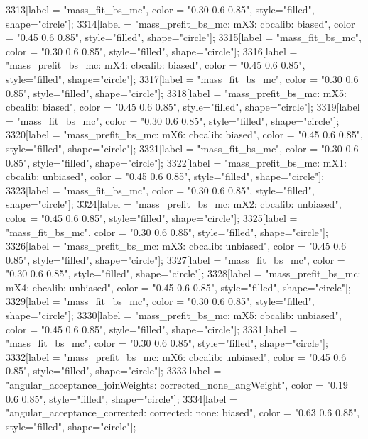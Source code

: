 {	3313[label = "mass_fit_bs_mc", color = "0.30 0.6 0.85", style="filled", shape="circle"];
	3314[label = "mass_prefit_bs_mc\nmassbin: mX3\nmassmodel: cbcalib\ntrigger: biased", color = "0.45 0.6 0.85", style="filled", shape="circle"];
	3315[label = "mass_fit_bs_mc", color = "0.30 0.6 0.85", style="filled", shape="circle"];
	3316[label = "mass_prefit_bs_mc\nmassbin: mX4\nmassmodel: cbcalib\ntrigger: biased", color = "0.45 0.6 0.85", style="filled", shape="circle"];
	3317[label = "mass_fit_bs_mc", color = "0.30 0.6 0.85", style="filled", shape="circle"];
	3318[label = "mass_prefit_bs_mc\nmassbin: mX5\nmassmodel: cbcalib\ntrigger: biased", color = "0.45 0.6 0.85", style="filled", shape="circle"];
	3319[label = "mass_fit_bs_mc", color = "0.30 0.6 0.85", style="filled", shape="circle"];
	3320[label = "mass_prefit_bs_mc\nmassbin: mX6\nmassmodel: cbcalib\ntrigger: biased", color = "0.45 0.6 0.85", style="filled", shape="circle"];
	3321[label = "mass_fit_bs_mc", color = "0.30 0.6 0.85", style="filled", shape="circle"];
	3322[label = "mass_prefit_bs_mc\nmassbin: mX1\nmassmodel: cbcalib\ntrigger: unbiased", color = "0.45 0.6 0.85", style="filled", shape="circle"];
	3323[label = "mass_fit_bs_mc", color = "0.30 0.6 0.85", style="filled", shape="circle"];
	3324[label = "mass_prefit_bs_mc\nmassbin: mX2\nmassmodel: cbcalib\ntrigger: unbiased", color = "0.45 0.6 0.85", style="filled", shape="circle"];
	3325[label = "mass_fit_bs_mc", color = "0.30 0.6 0.85", style="filled", shape="circle"];
	3326[label = "mass_prefit_bs_mc\nmassbin: mX3\nmassmodel: cbcalib\ntrigger: unbiased", color = "0.45 0.6 0.85", style="filled", shape="circle"];
	3327[label = "mass_fit_bs_mc", color = "0.30 0.6 0.85", style="filled", shape="circle"];
	3328[label = "mass_prefit_bs_mc\nmassbin: mX4\nmassmodel: cbcalib\ntrigger: unbiased", color = "0.45 0.6 0.85", style="filled", shape="circle"];
	3329[label = "mass_fit_bs_mc", color = "0.30 0.6 0.85", style="filled", shape="circle"];
	3330[label = "mass_prefit_bs_mc\nmassbin: mX5\nmassmodel: cbcalib\ntrigger: unbiased", color = "0.45 0.6 0.85", style="filled", shape="circle"];
	3331[label = "mass_fit_bs_mc", color = "0.30 0.6 0.85", style="filled", shape="circle"];
	3332[label = "mass_prefit_bs_mc\nmassbin: mX6\nmassmodel: cbcalib\ntrigger: unbiased", color = "0.45 0.6 0.85", style="filled", shape="circle"];
	3333[label = "angular_acceptance_joinWeights\nwflag: corrected_none_angWeight", color = "0.19 0.6 0.85", style="filled", shape="circle"];
	3334[label = "angular_acceptance_corrected\nangacc: corrected\ncsp: none\ntrigger: biased", color = "0.63 0.6 0.85", style="filled", shape="circle"];
}
